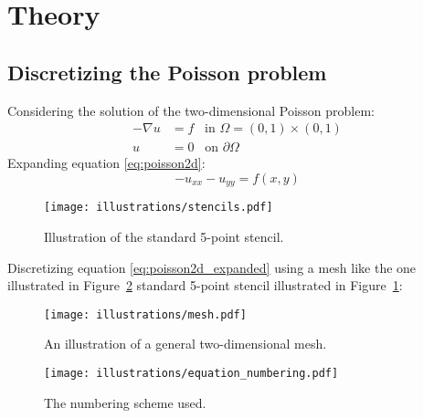 
\section{Theory} %

\subsection{Discretizing the Poisson problem}
\label{sec:discretizing_the_poisson_problem}
Considering the solution of the two-dimensional Poisson problem:
\begin{align}
  - \nabla u &= f \;\;\; \text{in } \Omega = (0,1) \times (0,1) \label{eq:poisson2d} \\
  u &= 0 \;\;\; \text{on } \partial \Omega \label{eq:poisson2d_edge}
\end{align}
Expanding equation \eqref{eq:poisson2d}:
\begin{equation}
  -u_{xx} - u_{yy} = f(x,y) \label{eq:poisson2d_expanded}
\end{equation}

\begin{figure}[htbp]
  \centering
  \texttt{[image: illustrations/stencils.pdf]}
  \caption{Illustration of the standard 5-point stencil.}
  \label{fig:stencil}
\end{figure}

Discretizing equation \eqref{eq:poisson2d_expanded} using a mesh like the one illustrated in Figure~\ref{fig:mesh} standard 5-point stencil illustrated in Figure~\ref{fig:stencil}:

\begin{figure}[htbp]
  \centering
  \texttt{[image: illustrations/mesh.pdf]}
  \caption{An illustration of a general two-dimensional mesh.}
  \label{fig:mesh}
\end{figure}

\begin{figure}[htbp]
  \centering
  \texttt{[image: illustrations/equation\_numbering.pdf]}
  \caption{The numbering scheme used.}
  \label{fig:numbering_scheme}
\end{figure}


